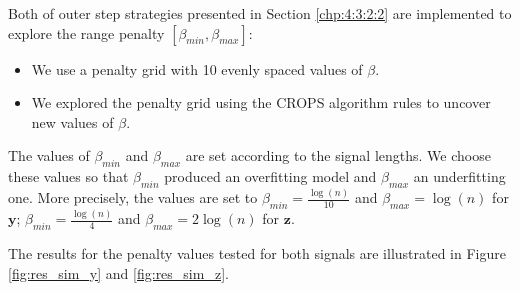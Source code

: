 Both of outer step strategies presented in Section \ref{chp:4:3:2:2} are implemented to explore the range penalty $[\beta_{min},\beta_{max}]$: 
\begin{itemize}
\item We use a penalty grid with 10 evenly spaced values of $\beta$.  
\item We explored the penalty grid using the CROPS algorithm rules to uncover new values of $\beta$.
\end{itemize}

The values of $\beta_{min}$ and $\beta_{max}$ are set according to the signal lengths. We choose these values so that $\beta_{min}$ produced an overfitting model and $\beta_{max}$ an underfitting one. More precisely, the values are set to $\beta_{min} = \frac{\log(n)}{10}$ and $\beta_{max} = \log(n)$ for $\bm y$; $\beta_{min} = \frac{\log(n)}{4}$ and $\beta_{max} = 2\log(n)$ for $\bm z$.

The results for the penalty values tested for both signals are illustrated in Figure \ref{fig:res_sim_y} and \ref{fig:res_sim_z}.

